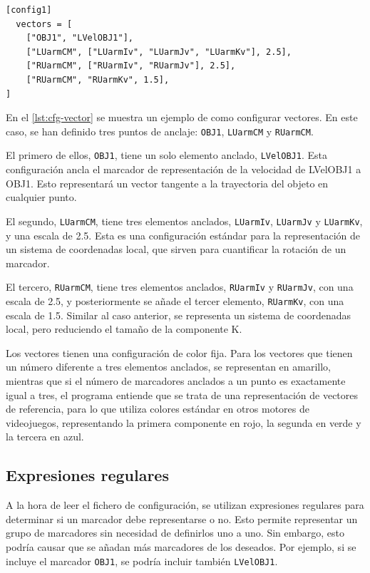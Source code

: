\begin{lstlisting}[style=mystyle, caption={Configuración de un vector}, label={lst:cfg-vector}]
[config1]
  vectors = [ 
    ["OBJ1", "LVelOBJ1"],
    ["LUarmCM", ["LUarmIv", "LUarmJv", "LUarmKv"], 2.5],
    ["RUarmCM", ["RUarmIv", "RUarmJv"], 2.5],
    ["RUarmCM", "RUarmKv", 1.5],
]
\end{lstlisting}

En el \autoref{lst:cfg-vector} se muestra un ejemplo de como configurar vectores. En este caso, se han definido tres puntos de anclaje: \texttt{OBJ1}, \texttt{LUarmCM} y \texttt{RUarmCM}. 

El primero de ellos, \texttt{OBJ1}, tiene un solo elemento anclado, \texttt{LVelOBJ1}. Esta configuración ancla el marcador de representación de la velocidad de LVelOBJ1 a OBJ1. Esto representará un vector tangente a la trayectoria del objeto en cualquier punto.

El segundo, \texttt{LUarmCM}, tiene tres elementos anclados, \texttt{LUarmIv}, \texttt{LUarmJv} y \texttt{LUarmKv}, y una escala de 2.5. Esta es una configuración estándar para la representación de un sistema de coordenadas local, que sirven para cuantificar la rotación de un marcador.

El tercero, \texttt{RUarmCM}, tiene tres elementos anclados, \texttt{RUarmIv} y \texttt{RUarmJv}, con una escala de 2.5, y posteriormente se añade el tercer elemento, \texttt{RUarmKv}, con una escala de 1.5. Similar al caso anterior, se representa un sistema de coordenadas local, pero reduciendo el tamaño de la componente K.

Los vectores tienen una configuración de color fija. Para los vectores que tienen un número diferente a tres elementos anclados, se representan en amarillo, mientras que si el número de marcadores anclados a un punto es exactamente igual a tres, el programa entiende que se trata de una representación de vectores de referencia, para lo que utiliza colores estándar en otros motores de videojuegos, representando la primera componente en rojo, la segunda en verde y la tercera en azul. 

\subsection{Expresiones regulares}

A la hora de leer el fichero de configuración, se utilizan expresiones regulares para determinar si un marcador debe representarse o no. Esto permite representar un grupo de marcadores sin necesidad de definirlos uno a uno. Sin embargo, esto podría causar que se añadan más marcadores de los deseados. Por ejemplo, si se incluye el marcador \texttt{OBJ1}, se podría incluir también \texttt{LVelOBJ1}. 

